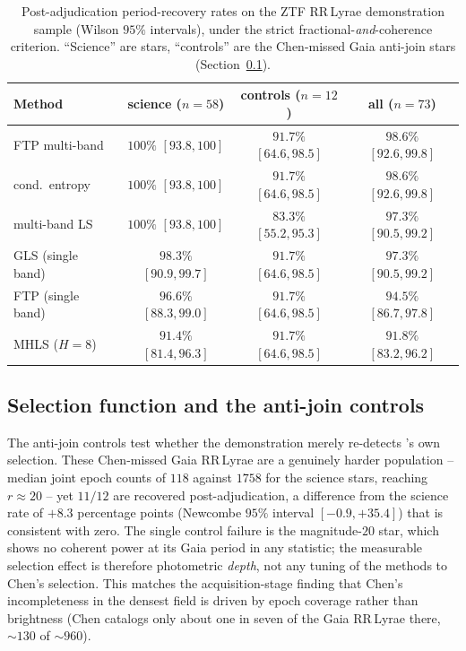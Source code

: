 \documentclass[apj]{emulateapj}
\begin{document}
\begin{table}
\centering
\caption{\label{tab:ztfrecovery}Post-adjudication period-recovery rates on the
ZTF RR\,Lyrae demonstration sample (Wilson $95\%$ intervals), under the strict
fractional-\emph{and}-coherence criterion.  ``Science'' are
\citet{Chen_etal_2020} stars, ``controls'' are the Chen-missed Gaia anti-join
stars (Section~\ref{sec:ztfdemo-select}).}
\footnotesize
\begin{tabular}{lccc}
\hline\hline
Method & science ($n{=}58$) & controls ($n{=}12$) & all ($n{=}73$) \\
\hline
FTP multi-band     & $100\%$ $[93.8,100]$ & $91.7\%$ $[64.6,98.5]$ & $98.6\%$ $[92.6,99.8]$ \\
cond.\ entropy     & $100\%$ $[93.8,100]$ & $91.7\%$ $[64.6,98.5]$ & $98.6\%$ $[92.6,99.8]$ \\
multi-band LS      & $100\%$ $[93.8,100]$ & $83.3\%$ $[55.2,95.3]$ & $97.3\%$ $[90.5,99.2]$ \\
GLS (single band)  & $98.3\%$ $[90.9,99.7]$ & $91.7\%$ $[64.6,98.5]$ & $97.3\%$ $[90.5,99.2]$ \\
FTP (single band)  & $96.6\%$ $[88.3,99.0]$ & $91.7\%$ $[64.6,98.5]$ & $94.5\%$ $[86.7,97.8]$ \\
MHLS ($H{=}8$)     & $91.4\%$ $[81.4,96.3]$ & $91.7\%$ $[64.6,98.5]$ & $91.8\%$ $[83.2,96.2]$ \\
\hline
\end{tabular}
\end{table}

\subsection{Selection function and the anti-join controls}
\label{sec:ztfdemo-select}

The anti-join controls test whether the demonstration merely re-detects
\citet{Chen_etal_2020}'s own selection.  These Chen-missed Gaia RR\,Lyrae are a
genuinely harder population -- median joint epoch counts of $118$ against
$1758$ for the science stars, reaching $r\approx20$ -- yet $11/12$ are
recovered post-adjudication, a difference from the science rate of $+8.3$
percentage points (Newcombe $95\%$ interval $[-0.9,+35.4]$) that is consistent
with zero.  The single control failure is the magnitude-$20$ star, which shows
no coherent power at its Gaia period in any statistic; the measurable selection
effect is therefore photometric \emph{depth}, not any tuning of the methods to
Chen's selection.  This matches the acquisition-stage finding that Chen's
incompleteness in the densest field is driven by epoch coverage rather than
brightness (Chen catalogs only about one in seven of the Gaia RR\,Lyrae
there, ${\sim}130$ of ${\sim}960$).
\end{document}
